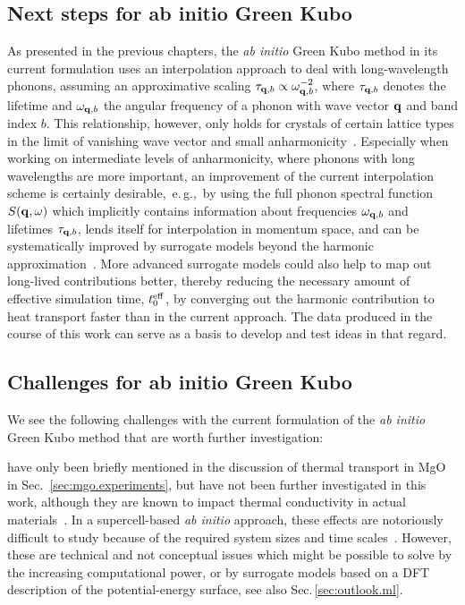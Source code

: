 \subsection*{Next steps for ab initio Green Kubo}
As presented in the previous chapters, the \emph{ab initio} Green Kubo method in its current formulation uses an interpolation approach to deal with long-wavelength phonons, assuming an approximative scaling $\tau_{{\bf q}, b} \propto \omega^{-2}_{{\bf q}, b}$, where $\tau_{{\bf q}, b}$ denotes the lifetime and $\omega_{{\bf q}, b}$ the angular frequency of a phonon with wave vector ${\bf q}$ and band index $b$. This relationship, however, only holds for crystals of certain lattice types in the limit of vanishing wave vector and small anharmonicity~\cite{Herring.1954}. Especially when working on intermediate levels of anharmonicity, where phonons with long wavelengths are more important, an improvement of the current interpolation scheme is certainly desirable,~e.\,g.,~by using the full phonon spectral function $S({\bf q}, \omega)$ which implicitly contains information about frequencies $\omega_{{\bf q}, b}$ and lifetimes $\tau_{{\bf q}, b}$, lends itself for interpolation in momentum space, and can be systematically improved by surrogate models beyond the harmonic approximation~\cite{Maradudin.1962}. More advanced surrogate models could also help to map out long-lived contributions better, thereby reducing the necessary amount of effective simulation time, $t^{\rm eff}_0$, by converging out the harmonic contribution to heat transport faster than in the current approach. The data produced in the course of this work can serve as a basis to develop and test ideas in that regard.


\subsection*{Challenges for ab initio Green Kubo}
We see the following challenges with the current formulation of the \emph{ab initio} Green Kubo method that are worth further investigation: 

 have only been briefly mentioned in the discussion of thermal transport in MgO in Sec.~\ref{sec:mgo.experiments}, but have not been further investigated in this work, although they are known to impact thermal conductivity in actual materials~\cite{Bisson.2000}. In a supercell-based \emph{ab initio} approach, these effects are notoriously difficult to study because of the required system sizes and time scales~\cite{Gibbons.2011}. However, these are technical and not conceptual issues which might be possible to solve by the increasing computational power, or by surrogate models based on a DFT description of the potential-energy surface, see also Sec.\,\ref{sec:outlook.ml}.

